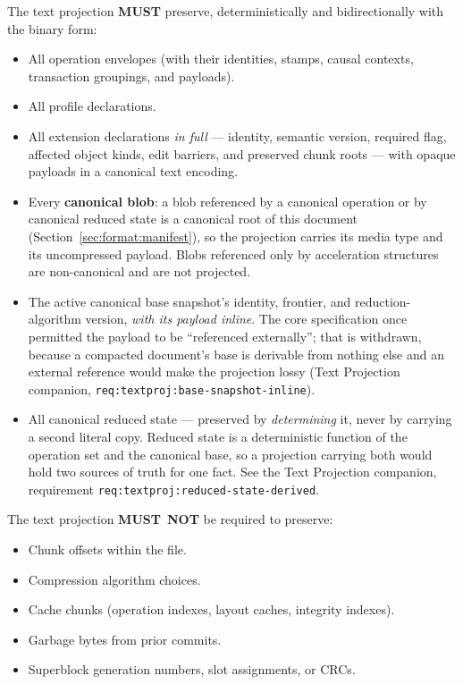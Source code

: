 \documentclass[11pt,letterpaper]{report}
\newcounter{requirement}[chapter]
\newcommand{\MUST}{\textbf{MUST}}
\newcommand{\MUSTNOT}{\textbf{MUST}\nobreak\ \textbf{NOT}}
\begin{document}
\begin{requirement}
  \label{req:format:textproj}
  The text projection \MUST{} preserve, deterministically and
  bidirectionally with the binary form:

  \begin{itemize}
    \item All operation envelopes (with their identities, stamps,
      causal contexts, transaction groupings, and payloads).
    \item All profile declarations.
    \item All extension declarations \emph{in full} --- identity, semantic
      version, required flag, affected object kinds, edit barriers, and
      preserved chunk roots --- with opaque payloads in a canonical text
      encoding.
    \item Every \textbf{canonical blob}: a blob referenced by a canonical
      operation or by canonical reduced state is a canonical root of this
      document (Section~\ref{sec:format:manifest}), so the projection carries
      its media type and its uncompressed payload. Blobs referenced only by
      acceleration structures are non-canonical and are not projected.
    \item The active canonical base snapshot's identity, frontier, and
      reduction-algorithm version, \emph{with its payload inline}. The core
      specification once permitted the payload to be ``referenced externally'';
      that is withdrawn, because a compacted document's base is derivable from
      nothing else and an external reference would make the projection lossy
      (Text Projection companion,
      \texttt{req:textproj:base-snapshot-inline}).
    \item All canonical reduced state --- preserved by \emph{determining} it,
      never by carrying a second literal copy. Reduced state is a deterministic
      function of the operation set and the canonical base, so a projection
      carrying both would hold two sources of truth for one fact. See the Text
      Projection companion, requirement
      \texttt{req:textproj:reduced-state-derived}.
  \end{itemize}

  The text projection \MUSTNOT{} be required to preserve:

  \begin{itemize}
    \item Chunk offsets within the file.
    \item Compression algorithm choices.
    \item Cache chunks (operation indexes, layout caches, integrity
      indexes).
    \item Garbage bytes from prior commits.
    \item Superblock generation numbers, slot assignments, or CRCs.
  \end{itemize}


\end{requirement}
\end{document}
